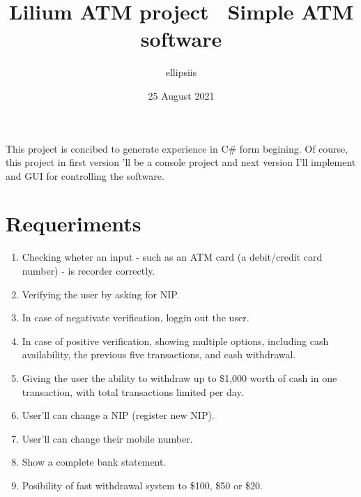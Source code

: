 \documentclass[letterpaper, 12pt]{article}
\title{Lilium ATM project \ Simple ATM software}
\author{\@ ellipsiis}
\date{25 August 2021}
\begin{document}
\maketitle
    This project is concibed to generate experience in C\# form begining. Of course, this project in first version
    'll be a console project and next version I'll implement and GUI for controlling the software.
    \section*{Requeriments}
    \begin{enumerate}
        \item Checking wheter an input - such as an ATM card (a debit/credit card number) - is recorder correctly.
        \item Verifying the user by asking for NIP.
        \item In case of negativate verification, loggin out the user.
        \item In case of positive verification, showing multiple options, including cash availability,
        the previous five transactions, and cash withdrawal.
        \item Giving the user the ability to withdraw up to \$1,000 worth of cash in one transaction,
        with total transactions limited per day.
        \item User'll can change a NIP (register new NIP).
        \item User'll can change their mobile number.
        \item Show a complete bank statement.
        \item Posibility of fast withdrawal system to \$100, \$50 or \$20.

    \end{enumerate}
\end{document}
